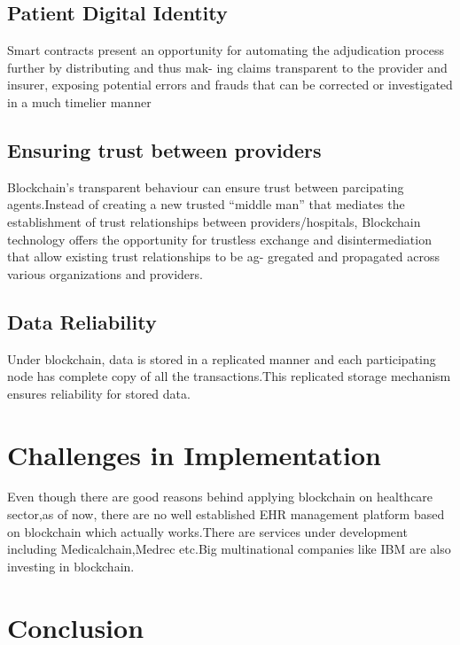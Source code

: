 \documentclass[12pt]{report}
\begin{document}
\section{Patient Digital Identity}
Smart contracts present
an opportunity for automating the adjudication process further by distributing and thus mak-
ing claims transparent to the provider and insurer, exposing potential errors and frauds that
can be corrected or investigated in a much timelier manner

\section{Ensuring trust between providers}
Blockchain's transparent behaviour can ensure trust between parcipating agents.Instead of creating a new trusted “middle man” that mediates the establishment of
trust relationships between providers/hospitals, Blockchain technology offers the opportunity
for trustless exchange and disintermediation that allow existing trust relationships to be ag-
gregated and propagated across various organizations and providers.

\section{Data Reliability}
Under blockchain, data is stored in a replicated manner and each participating node has complete copy of all the transactions.This replicated storage mechanism ensures reliability for stored data.

\chapter{Challenges in Implementation}
Even though there are good reasons behind applying blockchain on healthcare sector,as of now, there are no well established EHR management platform based on blockchain which actually works.There are services under development including Medicalchain,Medrec etc.Big multinational companies like IBM are also investing in blockchain.
\chapter{Conclusion}
\end{document}
